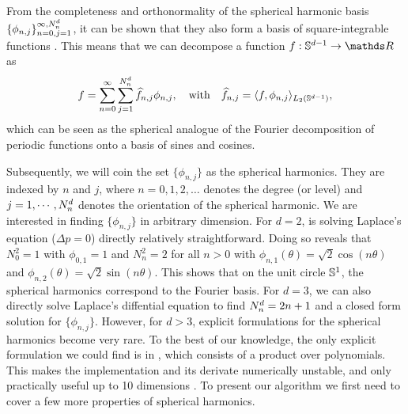 From the completeness and orthonormality of the spherical harmonic basis $\{\phi_{n,j}\}_{n=0,j=1}^{\infty,N^d_n}$, it can be shown that they also form a basis of square-integrable functions \citep{frye2014}. This means that we can decompose a function $f: \dsphere \rightarrow \Reals$ as
\begin{equation}
    f = \sum_{n=0}^{\infty} \sum_{j=1}^{N^d_n} \widehat{f}_{n, j} \phi_{n, j},\quad\text{with}\quad\widehat{f}_{n, j} = \langle f, \phi_{n, j} \rangle_{L_2(\mathbb{S}^{d-1})},
\end{equation}
which can be seen as the spherical analogue of the Fourier decomposition of periodic functions onto a basis of sines and cosines.

Subsequently, we will coin the set $\{\phi_{n,j}\}$ as the spherical harmonics. They are indexed by $n$ and $j$, where $n=0,1,2,\ldots$ denotes the degree (or level) and $j=1,\cdots,N^d_n$ denotes the orientation of the spherical harmonic. We are interested in finding $\{\phi_{n,j}\}$ in arbitrary dimension. For $d=2$, is solving Laplace's equation ($\Delta p = 0$) directly relatively straightforward. Doing so reveals that $N^{2}_0 = 1$ with $\phi_{0, 1} = 1$ and $N^{2}_n = 2$ for all $n > 0$ with $\phi_{n, 1}(\theta) = \sqrt{2} \cos(n \theta)$ and $\phi_{n, 2}(\theta) = \sqrt{2} \sin(n \theta)$. This shows that on the unit circle $\mathbb{S}^1$, the spherical harmonics correspond to the Fourier basis. For $d=3$, we can also directly solve Laplace's diffential equation to find $N^d_n = 2n + 1$ and a closed form solution for $\{\phi_{n,j}\}$. However, for $d > 3$, explicit formulations for the spherical harmonics become very rare. To the best of our knowledge, the only explicit formulation we could find is in \citet[Theorem~5.1]{dai2013}, which consists of a product over polynomials. This makes the implementation and its derivate numerically unstable, and only practically useful up to 10 dimensions \citep{Dutordoir2020spherical}. To present our algorithm we first need to cover a few more properties of spherical harmonics.

